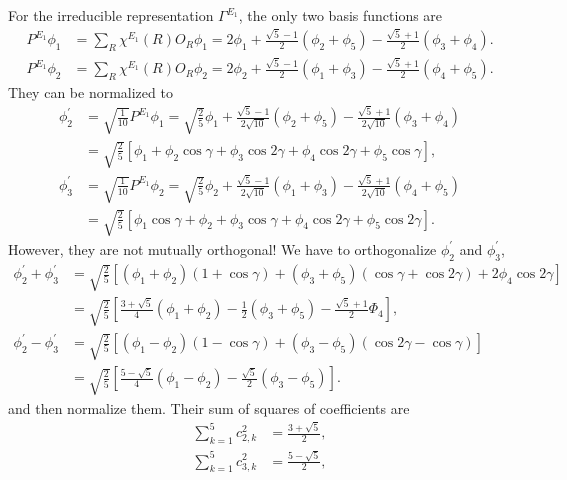 \documentclass[a4paper]{book}
\begin{document}
\begin{solution}
\begin{enumerate}[label=(\alph*)]
		For the irreducible representation $\Gamma^{E_1}$, the only two basis functions are
		\begin{align*}
			P^{E_1}\phi_1 &= \sum_{R} \chi^{E_1}(R) O_R \phi_1 = 2\phi_1 + \frac{\sqrt{5}-1}{2}(\phi_2 + \phi_5) - \frac{\sqrt{5}+1}{2}(\phi_3 + \phi_4). \\
			P^{E_1}\phi_2 &= \sum_{R} \chi^{E_1}(R) O_R \phi_2 = 2\phi_2 + \frac{\sqrt{5}-1}{2}(\phi_1 + \phi_3) - \frac{\sqrt{5}+1}{2}(\phi_4 + \phi_5).
		\end{align*}
		They can be normalized to
		\begin{align*}
			\phi^\prime_2 &= \sqrt{\frac{1}{10}} P^{E_1}\phi_1 = \sqrt{ \frac{2}{5} }\phi_1 + \frac{\sqrt{5}-1}{2\sqrt{10}}(\phi_2+\phi_5) - \frac{\sqrt{5}+1}{2\sqrt{10}}(\phi_3+\phi_4) \\
			&= \sqrt{ \frac{2}{5} } \left[ \phi_1 + \phi_2 \cos\gamma + \phi_3\cos2\gamma + \phi_4\cos2\gamma + \phi_5\cos\gamma \right], \\
			\phi^\prime_3 &= \sqrt{\frac{1}{10}} P^{E_1}\phi_2 = \sqrt{ \frac{2}{5} }\phi_2 + \frac{\sqrt{5}-1}{2\sqrt{10}}(\phi_1+\phi_3) - \frac{\sqrt{5}+1}{2\sqrt{10}}(\phi_4+\phi_5) \\
			&= \sqrt{ \frac{2}{5} } \left[ \phi_1\cos\gamma + \phi_2  + \phi_3\cos\gamma + \phi_4\cos2\gamma + \phi_5\cos2\gamma \right].
		\end{align*}
		However, they are not mutually orthogonal! We have to orthogonalize $\phi^\prime_2$ and $\phi^\prime_3$,
		\begin{align*}
			\phi^\prime_2 + \phi^\prime_3 &= \sqrt{ \frac{2}{5} } \left[ (\phi_1+\phi_2) (1+\cos\gamma) + (\phi_3+\phi_5) (\cos\gamma + \cos 2\gamma) + 2\phi_4\cos2\gamma \right] \\
			&= \sqrt{ \frac{2}{5} } \left[ \frac{3+\sqrt{5}}{4}(\phi_1 + \phi_2) - \frac{1}{2} (\phi_3 + \phi_5) - \frac{ \sqrt{5}+1 }{2} \Phi_4 \right] , \\
			\phi^\prime_2 - \phi^\prime_3 &= \sqrt{ \frac{2}{5} } \left[ (\phi_1-\phi_2) (1-\cos\gamma) + (\phi_3-\phi_5) (\cos2\gamma - \cos\gamma) \right] \\
			&=\sqrt{ \frac{2}{5} } \left[ \frac{ 5-\sqrt{5} }{4} (\phi_1 - \phi_2) - \frac{ \sqrt{5} }{2} (\phi_3 - \phi_5) \right].
		\end{align*}
		and then normalize them. Their sum of squares of coefficients are
		\begin{align*}
			\sum_{k=1}^5 c^2_{2,k} &= \frac{3+\sqrt{5}}{2}, \\
			\sum_{k=1}^5 c^2_{3,k} &= \frac{5-\sqrt{5}}{2},

\end{align*}
\end{enumerate}
\end{solution}
\end{document}
